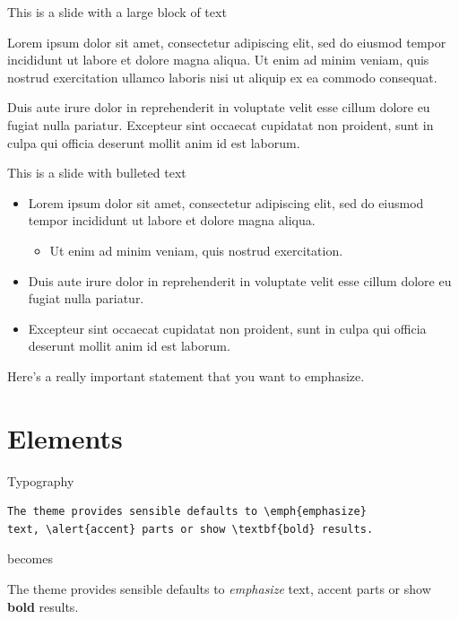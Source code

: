 \documentclass[aspectratio=169,10pt]{beamer}
\begin{document}
{{
}
\begin{frame}
\maketitle
\end{frame}
}

\begin{frame}{This is a slide with a large block of text}
\begin{block}{}
Lorem ipsum dolor sit amet, consectetur adipiscing elit,
sed do eiusmod tempor incididunt ut labore et dolore magna
aliqua. Ut enim ad minim veniam, quis nostrud exercitation
ullamco laboris nisi ut aliquip ex ea commodo consequat.

Duis aute irure dolor in reprehenderit in voluptate velit
esse cillum dolore eu fugiat nulla pariatur. Excepteur
sint occaecat cupidatat non proident, sunt in culpa qui
officia deserunt mollit anim id est laborum.
\end{block}
\end{frame}

\begin{frame}{This is a slide with bulleted text}
\begin{itemize}
\item Lorem ipsum dolor sit amet, consectetur adipiscing elit, sed do eiusmod
	tempor incididunt ut labore et dolore magna aliqua.
	\begin{itemize}
	\item Ut enim ad minim veniam, quis nostrud exercitation.
	\end{itemize}
\item Duis aute irure dolor in reprehenderit in voluptate velit esse cillum
	dolore eu fugiat nulla pariatur.
\item Excepteur sint occaecat cupidatat non proident, sunt in culpa qui officia
	deserunt mollit anim id est laborum.
\end{itemize}
\end{frame}

\begin{frame}[standout]
Here's a really important statement that you want to emphasize.
\end{frame}

\section{Elements}

\begin{frame}[fragile]{Typography}
\begin{verbatim}The theme provides sensible defaults to \emph{emphasize}
text, \alert{accent} parts or show \textbf{bold} results.\end{verbatim}

\begin{center}becomes\end{center}

The theme provides sensible defaults to \emph{emphasize} text,
\alert{accent} parts or show \textbf{bold} results.
\end{frame}
\end{document}
